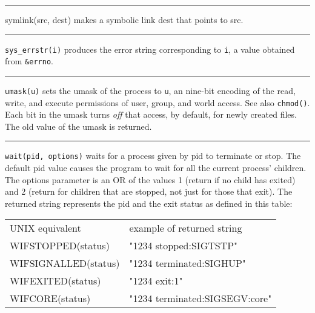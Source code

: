 \bigskip\hrule\vspace{0.1cm}

\noindent
{}symlink(src, dest) makes a symbolic link dest
that points to src.

\bigskip\hrule\vspace{0.1cm}

\noindent
{}\texttt{sys\_errstr(i)} produces the error string
corresponding to \texttt{i}, a value obtained from \texttt{\&errno}.

\bigskip\hrule\vspace{0.1cm}

\noindent
\texttt{umask(u)} sets the umask of the process to \texttt{u}, an nine-bit
encoding of the read, write, and execute permissions of user,
group, and world access. See also \texttt{chmod()}. Each bit in the umask turns
\textit{off} that access, by default, for newly created files. The old
value of the umask is returned.

\bigskip\hrule\vspace{0.1cm}

\noindent
\texttt{wait(pid, options)} waits for a process given by pid to terminate or
stop. The default pid value causes the program to wait for all the
current process' children. The options parameter is an
OR of the values 1 (return if no child has exited) and 2 (return for
children that are stopped, not just for those that exit). The returned
string represents the pid and the exit status as defined in this table:

\vspace{0.05in}
\begin{center}
\begin{xtabular}{m{2.4in} m{2.6in}}
 UNIX equivalent & example of returned string \\
 WIFSTOPPED(status) & "1234 stopped:SIGTSTP" \\
 WIFSIGNALLED(status) & "1234 terminated:SIGHUP" \\
 WIFEXITED(status) & "1234 exit:1" \\
 WIFCORE(status) & "1234 terminated:SIGSEGV:core" \\
\end{xtabular}
\end{center}
\vspace{0.05in}

